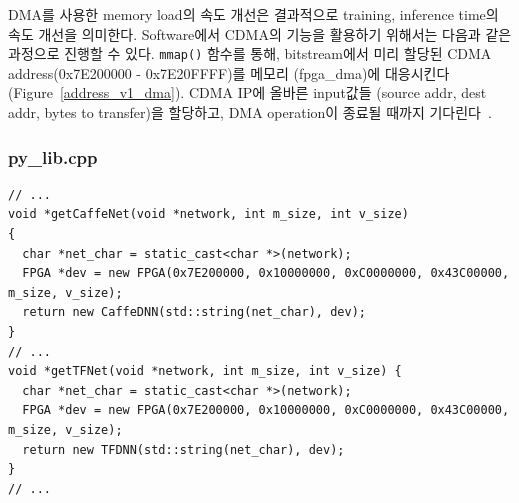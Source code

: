 \documentclass{article}
\begin{document}
DMA를 사용한 memory load의 속도 개선은 결과적으로 training, inference time의 속도 개선을 의미한다. Software에서 CDMA의 기능을 활용하기 위해서는 다음과 같은 과정으로 진행할 수 있다. \texttt{mmap()} 함수를 통해, bitstream에서 미리 할당된 CDMA address(0x7E200000 - 0x7E20FFFF)를 메모리 (fpga\_dma)에 대응시킨다 (Figure~\ref{address_v1_dma}). CDMA IP에 올바른 input값들 (source addr, dest addr, bytes to transfer)을 할당하고, DMA operation이 종료될 때까지 기다린다~\cite{CDMA}.

\subsubsection*{py\_lib.cpp}
\begin{lstlisting}[style={c-style}]
// ...
void *getCaffeNet(void *network, int m_size, int v_size)
{
  char *net_char = static_cast<char *>(network);
  FPGA *dev = new FPGA(0x7E200000, 0x10000000, 0xC0000000, 0x43C00000, m_size, v_size);
  return new CaffeDNN(std::string(net_char), dev);
}
// ...
void *getTFNet(void *network, int m_size, int v_size) {
  char *net_char = static_cast<char *>(network);
  FPGA *dev = new FPGA(0x7E200000, 0x10000000, 0xC0000000, 0x43C00000, m_size, v_size);
  return new TFDNN(std::string(net_char), dev);
}
// ...
\end{lstlisting}
\end{document}
